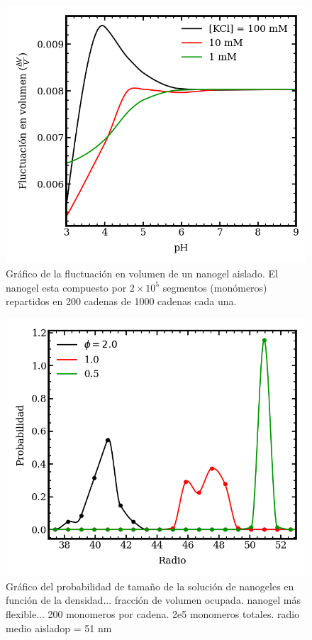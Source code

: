 \begin{figure}[!tb]
	\centering
	\includegraphics[width=1\linewidth]{Figures/graph-mc/dvv.png}
	\caption{Gr\'afico de la fluctuaci\'on en volumen de un nanogel aislado. El nanogel esta compuesto por $2\times 10^5$ segmentos (mon\'omeros) repartidos en 200 cadenas de 1000 cadenas cada una.}
	\label{fig:mc:dvvi}
\end{figure}



\begin{figure}[!tb]
	\centering
	\includegraphics[width=1\linewidth]{Figures/graph-mc/denton.png}
	\caption{Gr\'afico del probabilidad de tama\~no de la soluci\'on de  nanogeles en funci\'on de la densidad... fracci\'on de volumen ocupada. nanogel m\'as flexible... 200 monomeros por cadena. 2e5 monomeros totales. radio medio aisladop = 51 nm }
	\label{fig:mc:dentos-sizes}
\end{figure}
